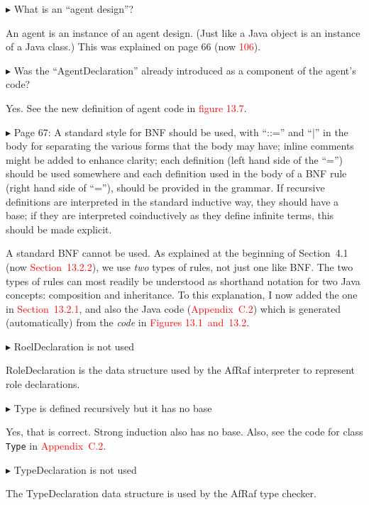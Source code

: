 \documentclass{article}
\newcommand*\R[1]{\textcolor{red}{#1}} %
\newenvironment{them}%
  {\bigskip\noindent\begingroup\color{blue}$\blacktriangleright$\enspace}%
  {\endgroup\par}
\begin{document}
\begin{them}
What is an ``agent design''? 
\end{them}

An agent is an instance of an agent design.
(Just like a Java object is an instance of a Java class.)
This was explained on page 66 (now \R{106}).

\begin{them}
Was the ``AgentDeclaration'' already introduced as a component of the agent's
code?
\end{them}
Yes. See the new definition of agent code in \R{figure 13.7}.

\begin{them}
Page 67:
A standard style for BNF should be used, with ``::='' and ``|'' in the body for
separating the various forms that the body may have; inline comments might be
added to enhance clarity; each definition (left hand side of the ``='') should be
used somewhere and each definition used in the body of a BNF rule (right hand
side of ``=''), should be provided in the grammar. If recursive definitions are
interpreted in the standard inductive way, they should have a base; if they are
interpreted coinductively as they define infinite terms, this should be made
explicit. 
\end{them}
A standard BNF cannot be used.
As explained at the beginning of Section~4.1
  (now \R{Section~13.2.2}),
  we use \emph{two} types of rules, not just one like BNF\null.
The two types of rules can most readily be understood as shorthand
  notation for two Java concepts: composition and inheritance.
To this explanation,
  I now added the one in \R{Section~13.2.1},
  and also the Java code (\R{Appendix~C.2})
    which is generated (automatically) from the \emph{code}
      in \R{Figures 13.1~and~13.2}.


\begin{them}
RoelDeclaration is not used 
\end{them}
RoleDeclaration is the data structure used by the AfRaf interpreter to
represent role declarations.

\begin{them}
Type is defined recursively but it has no base 
\end{them}
Yes, that is correct.
Strong induction also has no base.
Also, see the code for class {\tt Type} in \R{Appendix~C.2}.

\begin{them}
TypeDeclaration is not used 
\end{them}
The TypeDeclaration data structure is used by the AfRaf type checker.
\end{document}

